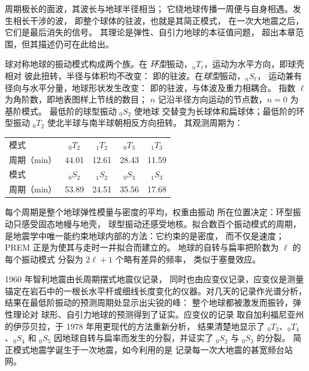 周期极长的面波，其波长与地球半径相当；
它绕地球传播一周便与自身相遇。发生相长干涉的波，
即整个球体的驻波，也就是其简正模式，
在一次大地震之后，它们是最后消失的信号。
其理论是弹性、自引力地球的本征值问题，
超出本章范围，但其描述仍可在此给出。

球对称地球的振动模式构成两个族。在
\emph{环型}振动，${}_nT_\ell$，运动为水平方向，即球壳相对
彼此扭转，半径与体积均不改变：
即的驻波。在\emph{球型}振动，${}_nS_\ell$，
运动兼有径向与水平分量，地球形状发生改变：
即的驻波，与体波及重力相耦合。
指数 $\ell$ 为角阶数，即地表图样上节线的数目；
$n$ 记沿半径方向运动的节点数，$n = 0$ 为基阶模式。
最低阶的球型振动 ${}_0S_2$ 使地球
交替变为长球体和扁球体；最低阶的环型振动
${}_0T_2$ 使北半球与南半球朝相反方向扭转。
其观测周期为：
\begin{center}
\small
\begin{tabular}{lcccc}
\hline
模式 & ${}_0T_2$ & ${}_1T_2$ & ${}_0T_3$ & ${}_1T_3$ \\
周期（\unit{min}） & 44.01 & 12.61 & 28.43 & 11.59 \\
\hline
模式 & ${}_0S_2$ & ${}_1S_2$ & ${}_0S_3$ & ${}_1S_3$ \\
周期（\unit{min}） & 53.89 & 24.51 & 35.56 & 17.68 \\
\hline
\end{tabular}
\end{center}
每个周期是整个地球弹性模量与密度的平均，权重由振动
所在位置决定：环型振动只感受固态地幔与地壳，
球型振动还感受地核。拟合数百个振动模式的周期，
是地震学中唯一能约束地球内部的方法：它约束的是密度，
而不仅是速度；PREM 正是为使其与走时一并拟合而建立的。
地球的自转与扁率把阶数为 $\ell$ 的每个振动模式
分裂为 $2\ell + 1$ 个略有差异的频率，
类似于塞曼效应。

\begin{history}[智利地震之后的地球]
1960 年智利地震由长周期摆式地震仪记录，
同时也由应变仪记录，应变仪是测量
锚定在岩石中的一根长水平杆或细线长度变化的仪器。对几天的记录作光谱分析，
结果在最低阶振动的预测周期处显示出尖锐的峰：
整个地球都被激发而振铃，弹性理论对
球形、自引力地球的预测得到了证实。应变仪的记录
取自加利福尼亚州的伊莎贝拉，于 1978 年用更现代的方法重新分析，
结果清楚地显示了 ${}_0T_3$、${}_0T_4$、${}_0S_4$
和 ${}_0S_5$ 因地球自转与扁率而发生的分裂，并证实了
${}_0S_2$ 与 ${}_0S_3$ 的分裂。
简正模式地震学诞生于一次地震，如今利用的是
记录每一次大地震的甚宽频台站网。
\end{history}

